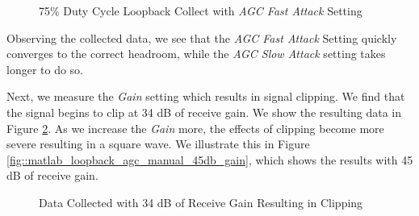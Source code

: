 \documentclass{article}
\begin{document}
\begin{figure}[H]
	\centerline{}
	\caption{75\% Duty Cycle Loopback Collect with \textit{AGC Fast Attack} Setting}
	\label{fig::matlab_loopback_agc_fast_attack_75p_duty_cycle}
\end{figure}

Observing the collected data, we see that the \textit{AGC Fast Attack} Setting quickly converges to the correct headroom, while the 
\textit{AGC Slow Attack} setting takes longer to do so.

Next, we measure the \textit{Gain} setting which results in signal clipping. We find that the signal begins to clip at 34 dB of receive gain. We show the resulting data in Figure \ref{fig::matlab_loopback_agc_manual_34db_gain}. As we increase the \textit{Gain} more, the effects of clipping become more severe resulting in a square wave. We illustrate this in Figure \ref{fig::matlab_loopback_agc_manual_45db_gain}, which shows the results with 45 dB of receive gain.

\begin{figure}[H]
	\centerline{}
	\caption{Data Collected with 34 dB of Receive Gain Resulting in Clipping}
	\label{fig::matlab_loopback_agc_manual_34db_gain}
\end{figure}
\end{document}
